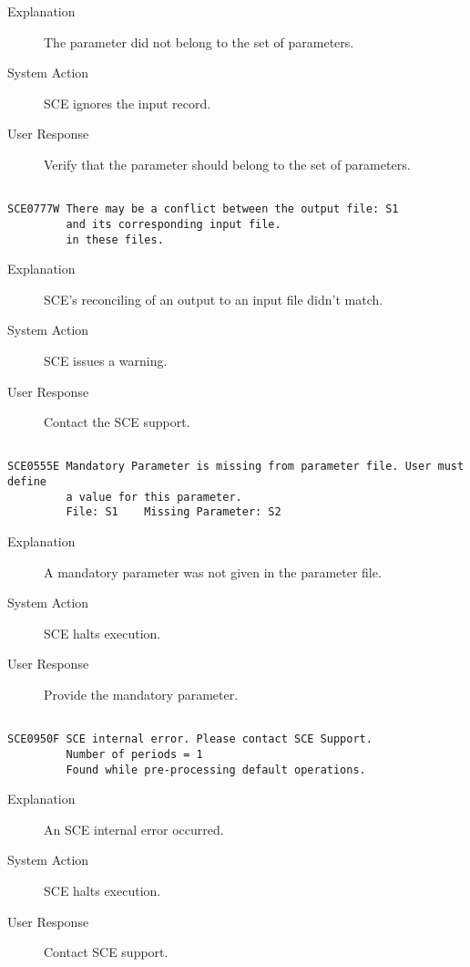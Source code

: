 \begin{description}
\item[Explanation]  The parameter did not belong to the set of parameters.  

\item[System Action]  SCE ignores the input record.

\item[User Response]  Verify that the parameter should belong to the set of parameters.
\end{description}
\hrulefill
\begin{verbatim}

SCE0777W There may be a conflict between the output file: S1
         and its corresponding input file.
         in these files.
\end{verbatim}
\begin{description}
\item[Explanation]  SCE's reconciling of an output to an input file didn't match.

\item[System Action]  SCE issues a warning.

\item[User Response]  Contact the SCE support.
\end{description}
\hrulefill
\begin{verbatim}

SCE0555E Mandatory Parameter is missing from parameter file. User must define
         a value for this parameter.
         File: S1    Missing Parameter: S2
\end{verbatim}
\begin{description}
\item[Explanation]  A mandatory parameter was not given in the parameter file.

\item[System Action]  SCE halts execution.

\item[User Response]  Provide the mandatory parameter.
\end{description}
\hrulefill
\begin{verbatim}

SCE0950F SCE internal error. Please contact SCE Support.
         Number of periods = 1
         Found while pre-processing default operations.
\end{verbatim}
\begin{description}
\item[Explanation]  An SCE internal error occurred.

\item[System Action]  SCE halts execution.

\item[User Response]  Contact SCE support.
\end{description}

